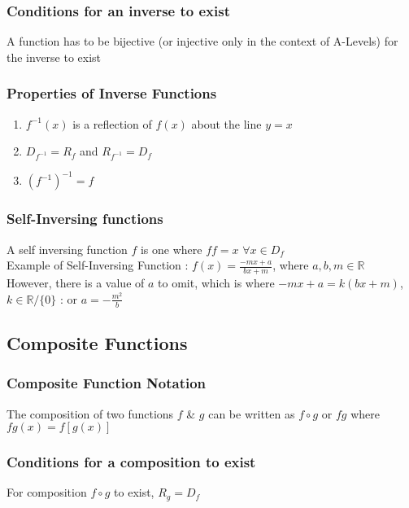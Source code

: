 \documentclass[../main.tex]{subfiles}
\begin{document}
\subsubsection{Conditions for an inverse to exist}
A function has to be bijective (or injective only in the
context of A-Levels) for the inverse to exist

\subsubsection{Properties of Inverse Functions}
\begin{enumerate}
    \item \(f^{-1}(x)\) is a reflection of \(f(x)\) about the line \(y=x\)
    \item \(\displaystyle D_{f^{-1}}=R_{f}\) and \(\displaystyle R_{f^{-1}}=D_{f}\)
    \item \(\displaystyle \left(f^{-1}\right)^{-1}=f\)
\end{enumerate}

\subsubsection{Self-Inversing functions}
A self inversing function \(f\) is one where \(ff=x\) \(\forall x \in D_{f}\) \\
Example of Self-Inversing Function : \(\displaystyle f(x) = \frac{-mx+a}{bx+m}\), where \(a,b,m\in\mathbb{R}\) \\
However, there is a value of \(a\) to omit, which is where \(-mx+a = k(bx+m)\), \(k\in\mathbb{R}\slash\{0\}\) : or \(\displaystyle a=-\frac{m^2}{b}\)

\subsection{Composite Functions}
\subsubsection{Composite Function Notation}
The composition of two functions \(f\) \& \(g\) can be written
as \(f \circ g\) or \(fg\) where \(fg(x)=f[g(x)]\) \\

\subsubsection{Conditions for a composition to exist}
For composition \(f \circ g\) to exist, \(R_{g}=D_{f}\)
\end{document}
